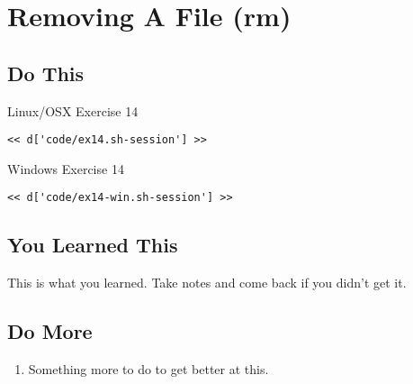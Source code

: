 \chapter{Removing A File (rm)}

\section{Do This}

\begin{code}{Linux/OSX Exercise 14}
\begin{Verbatim}
<< d['code/ex14.sh-session'] >>
\end{Verbatim}
\end{code}

\begin{code}{Windows Exercise 14}
\begin{Verbatim}
<< d['code/ex14-win.sh-session'] >>
\end{Verbatim}
\end{code}

\section{You Learned This}

This is what you learned.  Take notes and come back if you didn't get it.

\section{Do More}

\begin{enumerate}
\item Something more to do to get better at this.
\end{enumerate}

